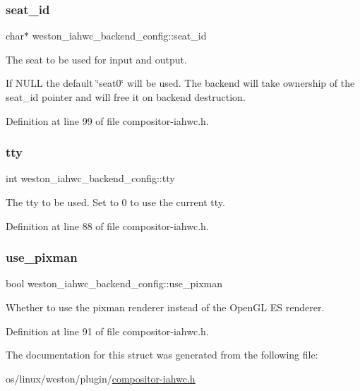 \subsubsection{\texorpdfstring{seat\+\_\+id}{seat\_id}}
{\footnotesize\ttfamily char$\ast$ weston\+\_\+iahwc\+\_\+backend\+\_\+config\+::seat\+\_\+id}

The seat to be used for input and output.

If N\+U\+LL the default \char`\"{}seat0\char`\"{} will be used. The backend will take ownership of the seat\+\_\+id pointer and will free it on backend destruction. 

Definition at line 99 of file compositor-\/iahwc.\+h.

\mbox{\label{structweston__iahwc__backend__config_a61199ee6b7a616cb0fe28b66b7c0d720}} 
\subsubsection{\texorpdfstring{tty}{tty}}
{\footnotesize\ttfamily int weston\+\_\+iahwc\+\_\+backend\+\_\+config\+::tty}

The tty to be used. Set to 0 to use the current tty. 

Definition at line 88 of file compositor-\/iahwc.\+h.

\mbox{\label{structweston__iahwc__backend__config_af939b243b744604cb451f831a29c5357}} 
\subsubsection{\texorpdfstring{use\+\_\+pixman}{use\_pixman}}
{\footnotesize\ttfamily bool weston\+\_\+iahwc\+\_\+backend\+\_\+config\+::use\+\_\+pixman}

Whether to use the pixman renderer instead of the Open\+GL ES renderer. 

Definition at line 91 of file compositor-\/iahwc.\+h.



The documentation for this struct was generated from the following file\+:\begin{DoxyCompactItemize}
\item 
os/linux/weston/plugin/\mbox{\hyperlink{compositor-iahwc_8h}{compositor-\/iahwc.\+h}}\end{DoxyCompactItemize}
